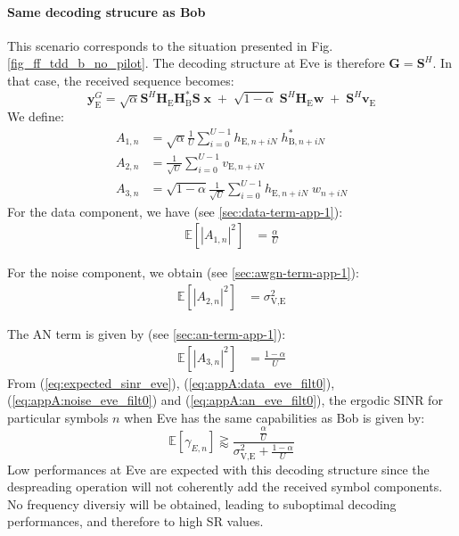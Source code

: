 \documentclass[journal,comsoc]{IEEEtran}
\newcommand{\EX}[1]{\mathbb{E} \left[#1\right]}%
\newcommand{\HE}{\textbf{H}_{\text{E}}}
\newcommand{\ve}{\textbf{v}_{\text{E}}}
\newcommand{\spread}{\textbf{S}}
\newcommand{\w}{\textbf{w}}
\begin{document}
\paragraph{Same decoding strucure as Bob}
\label{sec:same-decoding-strucure-as-bob}
This scenario corresponds to the situation presented in Fig.\ref{fig_ff_tdd_b_no_pilot}. The decoding structure at Eve is therefore $\textbf{G}=\spread^H$. In that case, the received sequence becomes:
\begin{equation}
\textbf{y}_{\text{E}}^G = \sqrt{\alpha} \spread^H \HE \textbf{H}^*_{\text{B}} \spread\; \textbf{x} \; +  \; \sqrt{1-\alpha} \; \spread^H \HE \w  \; +  \; \spread^H  \ve 
\label{eq:rx_eve_filt0}
\end{equation}
We define:
\begin{equation}
\begin{split}
A_{1,n} &= \sqrt{\alpha}\frac{1}{U}\sum_{i=0}^{U-1}  h_{\text{E}, n + iN} \; h^*_{\text{B}, n + iN} \\
A_{2,n} &= \frac{1}{\sqrt{U}}\sum_{i=0}^{U-1}  v_{\text{E}, n + iN}\\
A_{3,n} &= \sqrt{1-\alpha}\frac{1}{\sqrt{U}}\sum_{i=0}^{U-1}  h_{\text{E}, n + iN} \; w_{n + iN}
\end{split}
\end{equation}
For the data component, we have (see \ref{sec:data-term-app-1}):
\begin{equation}
	\begin{split}
	\EX{|A_{1,n}|^2}&= \frac{\alpha}{U}
	\end{split}
	\label{eq:appA:data_eve_filt0}
\end{equation}

For the noise component, we obtain (see \ref{sec:awgn-term-app-1}):
\begin{equation}
	\begin{split}
	\EX{|A_{2,n}|^2} &=\sigma^2_{\text{V,E}}
	\end{split}
	\label{eq:appA:noise_eve_filt0}
\end{equation}

The AN term is given by (see \ref{sec:an-term-app-1}):
\begin{equation}
	\begin{split}
	\EX{|A_{3,n}|^2}  &= \frac{1-\alpha}{U}
	\end{split}
	\label{eq:appA:an_eve_filt0}
\end{equation}
From (\ref{eq:expected_sinr_eve}), (\ref{eq:appA:data_eve_filt0}), (\ref{eq:appA:noise_eve_filt0}) and (\ref{eq:appA:an_eve_filt0}), the ergodic SINR for particular symbols $n$ when Eve has the same capabilities as Bob is given by:
\begin{equation}
\EX{\gamma_{E,n}} \gtrapprox \frac{\frac{\alpha}{U}}{\sigma^2_{\text{V,E}}+\frac{1-\alpha}{U}}
\label{eq:sinr_eve_filt0}
\end{equation}
Low performances at Eve are expected with this decoding structure since the despreading operation will not coherently add the received symbol components. No frequency diversiy will be obtained, leading to suboptimal decoding performances, and therefore to high SR values. 
\end{document}
